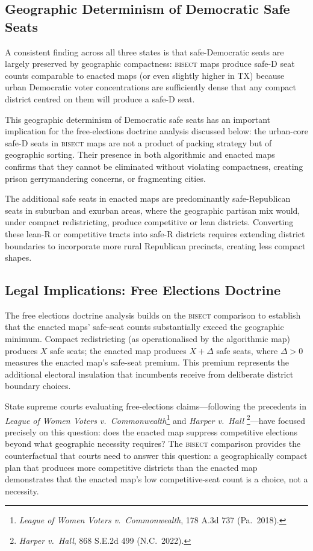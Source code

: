 \subsection{Geographic Determinism of Democratic Safe Seats}

A consistent finding across all three states is that safe-Democratic seats are largely
preserved by geographic compactness: \textsc{bisect} maps produce safe-D seat counts
comparable to enacted maps (or even slightly higher in TX) because urban Democratic
voter concentrations are sufficiently dense that any compact district centred on them
will produce a safe-D seat.

This geographic determinism of Democratic safe seats has an important implication for
the free-elections doctrine analysis discussed below: the urban-core safe-D seats in
\textsc{bisect} maps are not a product of packing strategy but of geographic sorting.
Their presence in both algorithmic and enacted maps confirms that they cannot be
eliminated without violating compactness, creating prison gerrymandering concerns, or
fragmenting cities.

The additional safe seats in enacted maps are predominantly safe-Republican seats in
suburban and exurban areas, where the geographic partisan mix would, under compact
redistricting, produce competitive or lean districts. Converting these lean-R or
competitive tracts into safe-R districts requires extending district boundaries to
incorporate more rural Republican precincts, creating less compact shapes.

\subsection{Legal Implications: Free Elections Doctrine}

The free elections doctrine analysis builds on the \textsc{bisect} comparison to
establish that the enacted maps' safe-seat counts substantially exceed the geographic
minimum. Compact redistricting (as operationalised by the algorithmic map) produces
$X$ safe seats; the enacted map produces $X + \Delta$ safe seats, where $\Delta > 0$
measures the enacted map's safe-seat premium. This premium represents the additional
electoral insulation that incumbents receive from deliberate district boundary choices.

State supreme courts evaluating free-elections claims---following the precedents in
\textit{League of Women Voters v.\ Commonwealth}\footnote{\textit{League of Women
Voters v.\ Commonwealth}, 178 A.3d 737 (Pa.\ 2018).} and \textit{Harper v.\ Hall}
\footnote{\textit{Harper v.\ Hall}, 868 S.E.2d 499 (N.C.\ 2022).}---have focused
precisely on this question: does the enacted map suppress competitive elections beyond
what geographic necessity requires? The \textsc{bisect} comparison provides the
counterfactual that courts need to answer this question: a geographically compact plan
that produces more competitive districts than the enacted map demonstrates that the
enacted map's low competitive-seat count is a choice, not a necessity.

